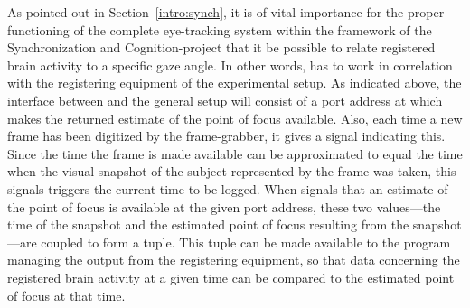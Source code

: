 As pointed out in Section~\ref{intro:synch}, it is of vital importance
for the proper functioning of the complete eye-tracking system within
the framework of the Synchronization and Cognition-project that it be
possible to relate registered brain activity to a specific gaze angle.
In other words, {\octopus} has to work in correlation with the
registering equipment of the experimental setup.  As indicated above,
the interface between {\octopus} and the general setup will consist of
a port address at which {\octopus} makes the returned estimate of the
point of focus available.  Also, each time a new frame has been
digitized by the frame-grabber, it gives a signal indicating this.
Since the time the frame is made available can be approximated to
equal the time when the visual snapshot of the subject represented by
the frame was taken, this signals triggers the current time to be
logged.  When {\octopus} signals that an estimate of the point of
focus is available at the given port address, these two values---the
time of the snapshot and the estimated point of focus resulting from
the snapshot---are coupled to form a tuple.  This tuple can be made
available to the program managing the output from the registering
equipment, so that data concerning the registered brain activity at a
given time can be compared to the estimated point of focus at that
time.

